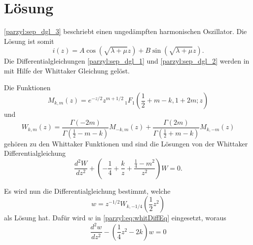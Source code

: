 %
%
%
\section{Lösung
\label{parzyl:section:teil1}}

\eqref{parzyl:sep_dgl_3} beschriebt einen ungedämpften harmonischen Oszillator.
Die Lösung ist somit
\begin{equation}
	i(z) 
	= 
	A\cos{ 
		\left ( 
		\sqrt{\lambda + \mu}z
		\right )}
	+
	B\sin{ 
		\left ( 
		\sqrt{\lambda + \mu}z
		\right )}.
\end{equation}
Die Differentialgleichungen \eqref{parzyl:sep_dgl_1} und \eqref{parzyl:sep_dgl_2} werden in \cite{parzyl:whittaker}
mit Hilfe der Whittaker Gleichung gelöst.
\begin{definition}
    Die Funktionen
    \begin{equation*}
        M_{k,m}(z) = 
    e^{-z/2} z^{m+1/2} \,
    {}_{1} F_{1}
    (
        {\textstyle \frac{1}{2}} 
        + m - k, 1 + 2m; z)
    \end{equation*}
    und
    \begin{equation*}
        W_{k,m}(z) = \frac{
            \Gamma \left( -2m\right)
        }{
            \Gamma \left( {\textstyle \frac{1}{2}} - m - k\right)
        }
        M_{-k, m} \left(z\right)
        +
        \frac{
            \Gamma \left( 2m\right)
        }{
            \Gamma \left( {\textstyle \frac{1}{2}} + m - k\right)
        }
        M_{k, -m} \left(z\right)
    \end{equation*}
    gehören zu den Whittaker Funktionen und sind die Lösungen
    von der Whittaker Differentialgleichung
    \begin{equation}
        \frac{d^2W}{d z^2} +
        \left(-\frac{1}{4}  + \frac{k}{z} + \frac{\frac{1}{4} - m^2}{z^2} \right) W = 0.
        \label{parzyl:eq:whitDiffEq}
    \end{equation}

\end{definition}
Es wird nun die Differentialgleichung bestimmt, welche
\begin{equation}
    w = z^{-1/2} W_{k,-1/4} \left({\textstyle \frac{1}{2}} z^2\right)
\end{equation}
als Lösung hat.
Dafür wird $w$ in \eqref{parzyl:eq:whitDiffEq} eingesetzt, woraus
\begin{equation}
    \frac{d^2 w}{dz^2} - \left(\frac{1}{4} z^2 - 2k\right) w = 0
\label{parzyl:eq:weberDiffEq}
\end{equation}
